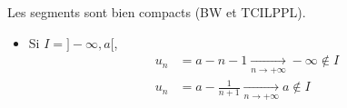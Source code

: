 \documentclass[../main.tex]{subfiles}
\begin{document}
Les segments sont bien compacts (BW et TCILPPL). \\
\begin{itemize}
    \item Si $I = ]-\infty, a[$, 
    \begin{align*}
        u_n &= a-n-1 \underset{n \to +\infty}{\longrightarrow} -\infty \not\in I \\
        u_n &= a - \frac{1}{n+1} \underset{n \to +\infty}{\longrightarrow} a \not\in I
    \end{align*} 
\end{itemize}
\end{document}
